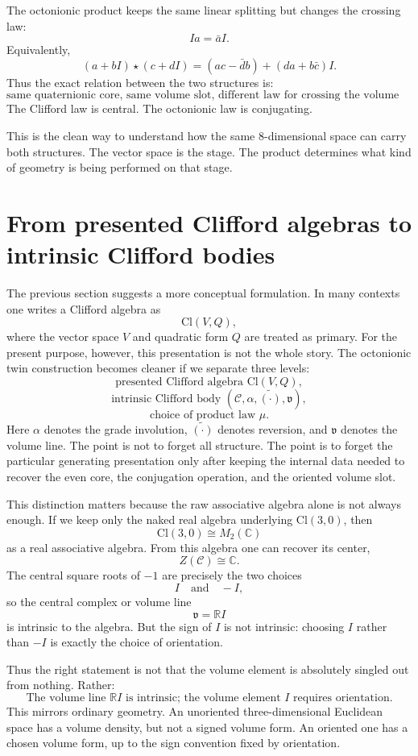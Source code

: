 \documentclass[11pt]{article}
\newcommand{\Cl}{\mathrm{Cl}}
\begin{document}
The octonionic product keeps the same linear splitting but changes the crossing
law:
\[
Ia=\bar a I.
\]
Equivalently,
\[
(a+bI)\star(c+dI)
=
(ac-\bar d b)+(da+b\bar c)I.
\]
Thus the exact relation between the two structures is:
\[
\boxed{
\text{same quaternionic core, same volume slot, different law for crossing the volume slot.}
}
\]
The Clifford law is central. The octonionic law is conjugating.

This is the clean way to understand how the same $8$-dimensional space can
carry both structures. The vector space is the stage. The product determines
what kind of geometry is being performed on that stage.


\section{From presented Clifford algebras to intrinsic Clifford bodies}

The previous section suggests a more conceptual formulation. In many contexts
one writes a Clifford algebra as
\[
\Cl(V,Q),
\]
where the vector space $V$ and quadratic form $Q$ are treated as primary.
For the present purpose, however, this presentation is not the whole story.
The octonionic twin construction becomes cleaner if we separate three levels:
\[
\text{presented Clifford algebra } \Cl(V,Q),
\]
\[
\text{intrinsic Clifford body } (\mathcal C,\alpha,\widetilde{(\cdot)},\mathfrak v),
\]
\[
\text{choice of product law } \mu.
\]
Here $\alpha$ denotes the grade involution, $\widetilde{(\cdot)}$ denotes
reversion, and $\mathfrak v$ denotes the volume line. The point is not to
forget all structure. The point is to forget the particular generating
presentation only after keeping the internal data needed to recover the even
core, the conjugation operation, and the oriented volume slot.

This distinction matters because the raw associative algebra alone is not
always enough. If we keep only the naked real algebra underlying $\Cl(3,0)$,
then
\[
\Cl(3,0)\cong M_2(\mathbb C)
\]
as a real associative algebra. From this algebra one can recover its center,
\[
Z(\mathcal C)\cong \mathbb C.
\]
The central square roots of $-1$ are precisely the two choices
\[
I \quad\text{and}\quad -I,
\]
so the central complex or volume line
\[
\mathfrak v=\mathbb R I
\]
is intrinsic to the algebra. But the sign of $I$ is not intrinsic: choosing
$I$ rather than $-I$ is exactly the choice of orientation.

Thus the right statement is not that the volume element is absolutely singled
out from nothing. Rather:
\[
\boxed{
\text{The volume line }\mathbb RI\text{ is intrinsic; the volume element }I
\text{ requires orientation.}
}
\]
This mirrors ordinary geometry. An unoriented three-dimensional Euclidean
space has a volume density, but not a signed volume form. An oriented one has
a chosen volume form, up to the sign convention fixed by orientation.
\end{document}
